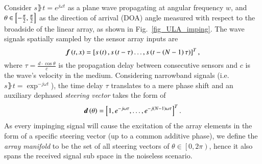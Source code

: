 Consider $s\rBrace{t} = e^{j\omega{t}}$ as a plane wave propagating at angular frequency $w$, and $\theta \in \left[{-\frac{\pi}{2},\frac{\pi}{2}}\right]$ as the direction of arrival (DOA) angle measured with respect to the broadside of the linear array, as shown in Fig.~\ref{fig_ULA_imping}.
The wave signals spatially sampled by the sensor array inputs are
\begin{equation}
\label{eq_prlm_timeSpace_outputVec}
\boldsymbol{f}\left({t,x}\right) = \left[{s\left({t}\right),s\left({t-\tau}\right)\dots, s\left({t-\left({N-1}\right)\tau}\right)}\right]^{T},
\end{equation}
where $\tau = \frac{d\cdot{}\cos{\theta}}{c}$ is the propagation delay between consecutive sensors and $c$ is the wave's velocity in the medium.
Considering narrowband signals (i.e. $s\rBrace{t}=\exp^{-j\omega{}t}$), the time delay $\tau$ translates to a mere phase shift and an auxiliary dephased \emph{steering vector} takes the form of
\begin{equation}
\boldsymbol{d}\left({\theta}\right)=\left[{1,e^{-j\omega\tau},\dots,e^{-j\left({N-1}\right)\omega\tau}}\right]^{T}.
\end{equation}
As every impinging signal will cause the excitation of the array elements in the form of a specific steering vector (up to a common additive phase), we define the \emph{array manifold} to be the set of all steering vectors of $\theta\in\left[0,2\pi\right)$, hence it also spans the received signal sub space in the noiseless scenario.
